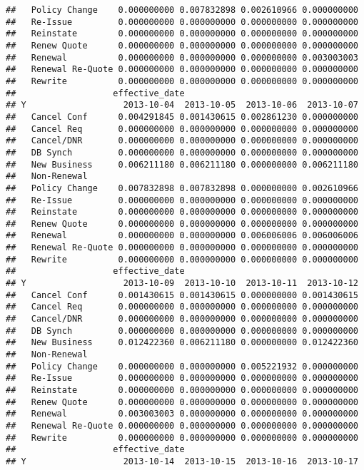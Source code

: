\documentclass[]{article}
\begin{document}
\begin{verbatim}
##   Policy Change    0.000000000 0.007832898 0.002610966 0.000000000
##   Re-Issue         0.000000000 0.000000000 0.000000000 0.000000000
##   Reinstate        0.000000000 0.000000000 0.000000000 0.000000000
##   Renew Quote      0.000000000 0.000000000 0.000000000 0.000000000
##   Renewal          0.000000000 0.000000000 0.000000000 0.003003003
##   Renewal Re-Quote 0.000000000 0.000000000 0.000000000 0.000000000
##   Rewrite          0.000000000 0.000000000 0.000000000 0.000000000
##                   effective_date
## Y                   2013-10-04  2013-10-05  2013-10-06  2013-10-07
##   Cancel Conf      0.004291845 0.001430615 0.002861230 0.000000000
##   Cancel Req       0.000000000 0.000000000 0.000000000 0.000000000
##   Cancel/DNR       0.000000000 0.000000000 0.000000000 0.000000000
##   DB Synch         0.000000000 0.000000000 0.000000000 0.000000000
##   New Business     0.006211180 0.006211180 0.000000000 0.006211180
##   Non-Renewal                                                     
##   Policy Change    0.007832898 0.007832898 0.000000000 0.002610966
##   Re-Issue         0.000000000 0.000000000 0.000000000 0.000000000
##   Reinstate        0.000000000 0.000000000 0.000000000 0.000000000
##   Renew Quote      0.000000000 0.000000000 0.000000000 0.000000000
##   Renewal          0.000000000 0.000000000 0.006006006 0.006006006
##   Renewal Re-Quote 0.000000000 0.000000000 0.000000000 0.000000000
##   Rewrite          0.000000000 0.000000000 0.000000000 0.000000000
##                   effective_date
## Y                   2013-10-09  2013-10-10  2013-10-11  2013-10-12
##   Cancel Conf      0.001430615 0.001430615 0.000000000 0.001430615
##   Cancel Req       0.000000000 0.000000000 0.000000000 0.000000000
##   Cancel/DNR       0.000000000 0.000000000 0.000000000 0.000000000
##   DB Synch         0.000000000 0.000000000 0.000000000 0.000000000
##   New Business     0.012422360 0.006211180 0.000000000 0.012422360
##   Non-Renewal                                                     
##   Policy Change    0.000000000 0.000000000 0.005221932 0.000000000
##   Re-Issue         0.000000000 0.000000000 0.000000000 0.000000000
##   Reinstate        0.000000000 0.000000000 0.000000000 0.000000000
##   Renew Quote      0.000000000 0.000000000 0.000000000 0.000000000
##   Renewal          0.003003003 0.000000000 0.000000000 0.000000000
##   Renewal Re-Quote 0.000000000 0.000000000 0.000000000 0.000000000
##   Rewrite          0.000000000 0.000000000 0.000000000 0.000000000
##                   effective_date
## Y                   2013-10-14  2013-10-15  2013-10-16  2013-10-17

\end{verbatim}
\end{document}
